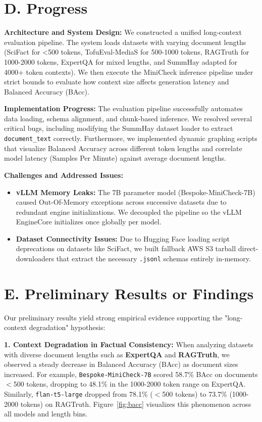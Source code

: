 \documentclass[12pt, letterpaper]{article}
\begin{document}
\section*{D. Progress}

\textbf{Architecture and System Design:} We constructed a unified long-context evaluation pipeline. The system loads datasets with varying document lengths (SciFact for <500 tokens, TofuEval-MediaS for 500-1000 tokens, RAGTruth for 1000-2000 tokens, ExpertQA for mixed lengths, and SummHay adapted for 4000+ token contexts). We then execute the MiniCheck inference pipeline under strict bounds to evaluate how context size affects generation latency and Balanced Accuracy (BAcc).

\textbf{Implementation Progress:} The evaluation pipeline successfully automates data loading, schema alignment, and chunk-based inference. We resolved several critical bugs, including modifying the SummHay dataset loader to extract \texttt{document\_text} correctly. Furthermore, we implemented dynamic graphing scripts that visualize Balanced Accuracy across different token lengths and correlate model latency (Samples Per Minute) against average document lengths.

\textbf{Challenges and Addressed Issues:} 
\begin{itemize}[leftmargin=*]
    \item \textbf{vLLM Memory Leaks:} The 7B parameter model (Bespoke-MiniCheck-7B) caused Out-Of-Memory exceptions across successive datasets due to redundant engine initializations. We decoupled the pipeline so the vLLM EngineCore initializes once globally per model.
    \item \textbf{Dataset Connectivity Issues:} Due to Hugging Face loading script deprecations on datasets like SciFact, we built fallback AWS S3 tarball direct-downloaders that extract the necessary \texttt{.jsonl} schemas entirely in-memory.
\end{itemize}

\section*{E. Preliminary Results or Findings}

Our preliminary results yield strong empirical evidence supporting the "long-context degradation" hypothesis:

\textbf{1. Context Degradation in Factual Consistency:}
When analyzing datasets with diverse document lengths such as \textbf{ExpertQA} and \textbf{RAGTruth}, we observed a steady decrease in Balanced Accuracy (BAcc) as document sizes increased. For example, \texttt{Bespoke-MiniCheck-7B} scored 58.7\% BAcc on documents $<$500 tokens, dropping to 48.1\% in the 1000-2000 token range on ExpertQA. Similarly, \texttt{flan-t5-large} dropped from 78.1\% ($<$500 tokens) to 73.7\% (1000-2000 tokens) on RAGTruth. Figure~\ref{fig:bacc} visualizes this phenomenon across all models and length bins.
\end{document}
